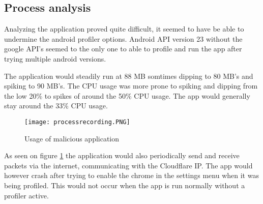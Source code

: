 \subsection{Process analysis}

Analyzing the application proved quite difficult, it seemed to have be able to undermine the android profiler options.  
Android API version 23 without the google API’s seemed to the only one to able to profile and run the app after trying multiple android versions. 

The application would steadily run at 88 MB somtimes dipping to 80 MB’s and spiking to 90 MB’s. 
The CPU usage was more prone to spiking and dipping from the low 20\% to spikes of around the 50\% CPU usage. 
The app would generally stay around the 33\% CPU usage.

\begin{figure}[H]
    \texttt{[image: processrecording.PNG]}
    \caption{Usage of malicious application}
    \label{tim-process}
\end{figure}

As seen on figure \ref{tim-process} the application would also periodically send and receive packets via the internet, communicating with the Cloudflare IP. 
The app would however crash after trying to enable the chrome in the settings menu when it was being profiled. 
This would not occur when the app is run normally without a profiler active. 